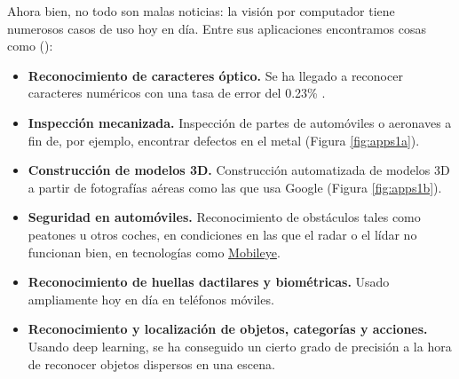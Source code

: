 Ahora bien, no todo son malas noticias: la visión por computador tiene numerosos casos de uso hoy en día. Entre sus aplicaciones encontramos cosas como (\citeauthor*{book:szeliski}):
\begin{itemize}
  \item \textbf{Reconocimiento de caracteres óptico.} Se ha llegado a reconocer caracteres numéricos con una tasa de error del 0.23\% \cite{art:2012arXiv1202.2745C}.
  \item \textbf{Inspección mecanizada.} Inspección de partes de automóviles o aeronaves a fin de, por ejemplo, encontrar defectos en el metal (Figura \ref{fig:apps1a}).
  \item \textbf{Construcción de modelos 3D.} Construcción automatizada de modelos 3D a partir de fotografías aéreas como las que usa Google
        (Figura \ref{fig:apps1b}).
  \item \textbf{Seguridad en automóviles.} Reconocimiento de obstáculos tales como peatones u otros coches, en condiciones en las que el radar o el lídar no funcionan bien, en tecnologías como \href{https://www.mobileye.com/}{Mobileye}.
  \item \textbf{Reconocimiento de huellas dactilares y biométricas.} Usado ampliamente hoy en día en teléfonos móviles.
  \item \textbf{Reconocimiento y localización de objetos, categorías y acciones.} Usando deep learning, se ha conseguido un cierto grado de precisión a la hora de reconocer objetos dispersos en una escena.
\end{itemize}

